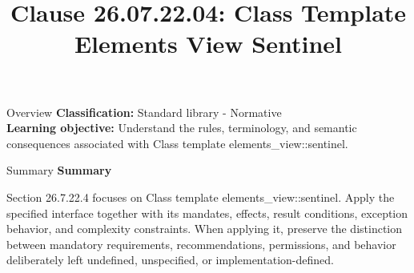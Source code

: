 \documentclass[10pt,letterpaper]{article}
\title{Clause 26.07.22.04: Class Template Elements View Sentinel}
\author{}
\date{}
\begin{document}
\maketitle
\begin{CornellOverviewBox}{Overview}
\textbf{Classification:} Standard library - Normative\\[2pt]
\textbf{Learning objective:} Understand the rules, terminology, and semantic consequences associated with Class template elements\_view::sentinel.
\end{CornellOverviewBox}\begin{CornellSummaryBox}{Summary}
{\sffamily\bfseries\color{Accent} Summary}\par\vspace{3pt}Section 26.7.22.4 focuses on Class template elements\_view::sentinel. Apply the specified interface together with its mandates, effects, result conditions, exception behavior, and complexity constraints. When applying it, preserve the distinction between mandatory requirements, recommendations, permissions, and behavior deliberately left undefined, unspecified, or implementation-defined.
\end{CornellSummaryBox}
\end{document}
